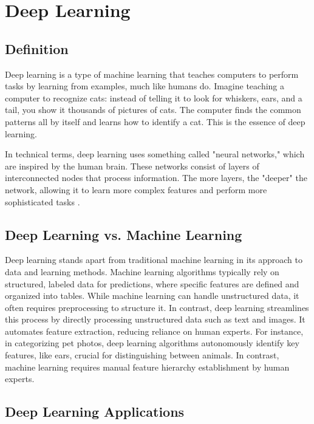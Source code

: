 \section{Deep Learning}

\subsection{Definition}

Deep learning is a type of machine learning that teaches computers to perform tasks by learning from examples, much like humans do. Imagine teaching a computer to recognize cats: instead of telling it to look for whiskers, ears, and a tail, you show it thousands of pictures of cats. The computer finds the common patterns all by itself and learns how to identify a cat. This is the essence of deep learning.

In technical terms, deep learning uses something called "neural networks," which are inspired by the human brain. These networks consist of layers of interconnected nodes that process information. The more layers, the "deeper" the network, allowing it to learn more complex features and perform more sophisticated tasks \cite{datacamp:dl}.


\subsection{Deep Learning vs. Machine Learning}

Deep learning stands apart from traditional machine learning in its approach to data and learning methods.
Machine learning algorithms typically rely on structured, labeled data for predictions, where specific features are defined and organized into tables.
While machine learning can handle unstructured data, it often requires preprocessing to structure it. In contrast, deep learning streamlines this process by directly processing unstructured data such as text and images. It automates feature extraction, reducing reliance on human experts. For instance, in categorizing pet photos, deep learning algorithms autonomously identify key features, like ears, crucial for distinguishing between animals. In contrast, machine learning requires manual feature hierarchy establishment by human experts.

\subsection{Deep Learning Applications}

